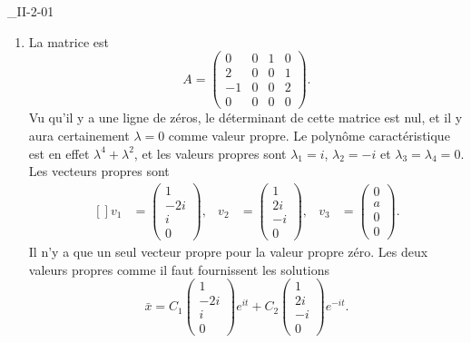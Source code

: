 \begin{corrige}{_II-2-01}
\begin{enumerate}
\item
La matrice est
\begin{equation}
	A=\begin{pmatrix}
 0	&	0	&	1	&	0	\\ 
 2	&	0	&	0	&	1	\\ 
 -1	&	0	&	0	&	2	\\ 
0	&	0	&	0	&	0	 
 \end{pmatrix}.
\end{equation}
Vu qu'il y a une ligne de zéros, le déterminant de cette matrice est nul, et il y aura certainement $\lambda=0$ comme valeur propre. Le polynôme caractéristique est en effet $\lambda^4+\lambda^2$, et les valeurs propres sont $\lambda_1=i$, $\lambda_2=-i$ et $\lambda_3=\lambda_4=0$. Les vecteurs propres sont
\begin{equation}
	\begin{aligned}[]
		v_1&=\begin{pmatrix}
	1	\\ 
	-2i	\\ 
	i	\\ 
	0	
\end{pmatrix},&v_2&=\begin{pmatrix}
	1	\\ 
	2i	\\ 
	-i	\\ 
	0	
\end{pmatrix},&v_3&=\begin{pmatrix}
	0	\\ 
	a	\\ 
	0	\\ 
	0	
\end{pmatrix}.
	\end{aligned}
\end{equation}
Il n'y a que un seul vecteur propre pour la valeur propre zéro. Les deux valeurs propres \og comme il faut\fg{} fournissent les solutions
\begin{equation}
	\bar x=C_1\begin{pmatrix}
	1	\\ 
	-2i	\\ 
	i	\\ 
	0	
\end{pmatrix} e^{it}+
C_2\begin{pmatrix}
	1	\\ 
	2i	\\ 
	-i	\\ 
	0	
\end{pmatrix} e^{-it}.
\end{equation}

\end{enumerate}
\end{corrige}
